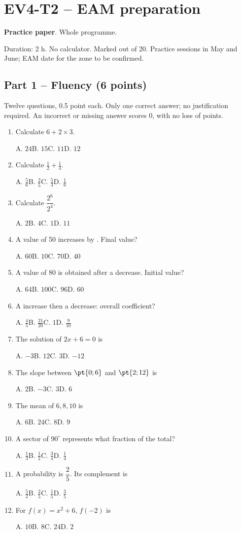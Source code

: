 \mxnewpage\section*{EV4-T2 -- EAM preparation}\label{EV4-T2}
\textbf{Practice paper}. Whole programme.\par Duration: 2 h. No calculator. Marked out of 20. Practice sessions in May and June; EAM date for the zone to be confirmed.
\subsection*{Part 1 -- Fluency (6 points)}
Twelve questions, \num{0,5} point each. Only one correct answer; no justification required. An incorrect or missing answer scores 0, with no loss of points.
\begin{enumerate}
\item Calculate $6+2\times3$.\par A. $24$\quad B. $15$\quad C. $11$\quad D. $12$
\item Calculate $\frac12+\frac13$.\par A. $\frac{5}{6}$\quad B. $\frac{2}{5}$\quad C. $\frac{5}{3}$\quad D. $\frac{1}{6}$
\item Calculate $\dfrac{2^6}{2^{4}}$.\par A. $2$\quad B. $4$\quad C. $1$\quad D. $11$
\item A value of 50 increases by . Final value?\par A. $60$\quad B. $10$\quad C. $70$\quad D. $40$
\item A value of 80 is obtained after a  decrease. Initial value?\par A. $64$\quad B. $100$\quad C. $96$\quad D. $60$
\item A  increase then a  decrease: overall coefficient?\par A. $\frac{4}{5}$\quad B. $\frac{21}{20}$\quad C. $1$\quad D. $\frac{9}{10}$
\item The solution of $2x+6=0$ is\par A. $-3$\quad B. $12$\quad C. $3$\quad D. $-12$
\item The slope between $\pt{0;6}$ and $\pt{2;12}$ is\par A. $2$\quad B. $-3$\quad C. $3$\quad D. $6$
\item The mean of $6, 8, 10$ is\par A. $6$\quad B. $24$\quad C. $8$\quad D. $9$
\item A sector of $90^\circ$ represents what fraction of the total?\par A. $\frac{1}{3}$\quad B. $\frac{1}{2}$\quad C. $\frac{3}{4}$\quad D. $\frac{1}{4}$
\item A probability is $\dfrac{2}{5}$. Its complement is\par A. $\frac{5}{2}$\quad B. $\frac{2}{5}$\quad C. $\frac{1}{5}$\quad D. $\frac{3}{5}$
\item For $f(x)=x^2+6$, $f(-2)$ is\par A. $10$\quad B. $8$\quad C. $24$\quad D. $2$
\end{enumerate}
